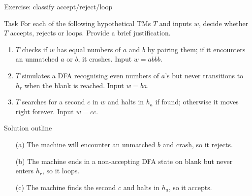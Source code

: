 \begin{frame}[t]{Exercise: classify accept/reject/loop}
  \begin{tblock}{Task}
    For each of the following hypothetical TMs $T$ and inputs $w$, decide
    whether $T$ accepts, rejects or loops.  Provide a brief justification.
    \begin{enumerate}
      \item $T$ checks if $w$ has equal numbers of $a$ and $b$ by
        pairing them; if it encounters an unmatched $a$ or $b$, it
        crashes.  Input $w=abbb$.
      \item $T$ simulates a DFA recognising even numbers of $a$’s
        but never transitions to $h_r$ when the blank is reached.
        Input $w=ba$.
      \item $T$ searches for a second $c$ in $w$ and halts in $h_a$ if
        found; otherwise it moves right forever.  Input $w=cc$.
    \end{enumerate}
  \end{tblock}
  \begin{talert}{Solution outline}
    \begin{itemize}
      \item[(a)] The machine will encounter an unmatched $b$ and crash,
        so it rejects.
      \item[(b)] The machine ends in a non‑accepting DFA state on
        blank but never enters $h_r$, so it loops.
      \item[(c)] The machine finds the second $c$ and halts in $h_a$,
        so it accepts.
    \end{itemize}
  \end{talert}
  \label{fr:7.2-13}
\end{frame}

